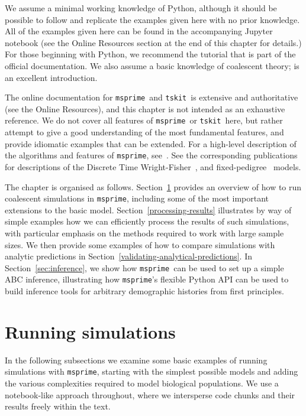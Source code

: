 \documentclass[graybox]{svmult}
\newcommand{\msprime}[0]{\texttt{msprime}}
\newcommand{\tskit}[0]{\texttt{tskit}}
\begin{document}
We assume a minimal working knowledge of Python, although it should be
possible to follow and replicate the examples given here with no prior
knowledge. All of the examples
given here can be found in the accompanying Jupyter notebook (see
the Online Resources section at the end of this chapter for details.)
For those beginning with Python, we recommend the
tutorial that is part of the official documentation.
We also assume a basic knowledge of coalescent theory;
\cite{wakely2008coalescent} is an excellent introduction.

The online documentation for \msprime\ and \tskit\ is extensive and
authoritative (see the Online Resources), and this chapter is not intended as an exhaustive reference.
We do not cover all features of \msprime\ or \tskit\ here, but rather
attempt to give a good understanding of the most fundamental features,
and provide idiomatic examples that can be extended. For a high-level
description of the algorithms and features of \msprime,
see~\cite{kelleher2016efficient,baumdicker2022efficient}.
See the corresponding publications for descriptions of
the Discrete Time Wright-Fisher~\cite{nelson2020accounting},
and fixed-pedigree~\cite{andersontrocme2023genes} models.

The chapter is organised as follows.
Section~\ref{running-simulations} provides an overview of how to run coalescent simulations in \msprime, including some of the most important extensions to the basic model.
Section~\ref{processing-results} illustrates by way of simple examples how we can efficiently process the results
of such simulations, with particular emphasis on the methods
required to work with large sample sizes. We then provide
some examples of how to compare simulations with analytic
predictions in Section~\ref{validating-analytical-predictions}.
In Section~\ref{sec:inference}, we show
how \msprime\ can be used to set up a simple ABC inference,
illustrating how
\msprime's flexible Python API can be used to build inference tools for
arbitrary demographic histories from first principles.

\section{Running simulations}
\label{running-simulations}
In the following subsections we examine some basic examples of running
simulations with \msprime, starting with the simplest possible models
and adding the various complexities required to model biological populations.
We use a notebook-like approach throughout, where we
intersperse code chunks and their results freely within the text.
\end{document}
